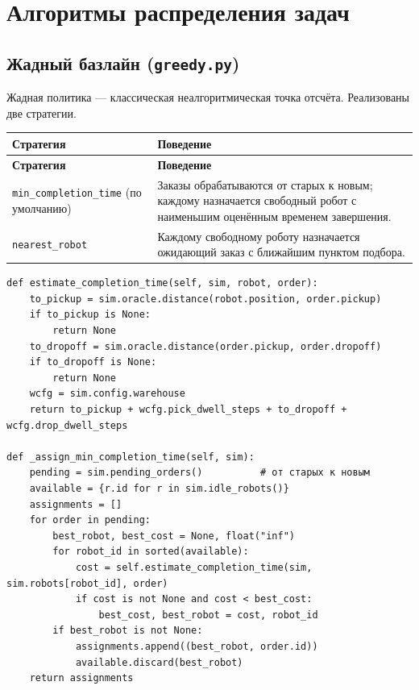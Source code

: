\documentclass[11pt,a4paper]{article}
\newcommand{\code}[1]{\texttt{#1}}
\begin{document}
\section{Алгоритмы распределения задач}
\subsection{Жадный базлайн (\code{greedy.py})}
Жадная политика — классическая неалгоритмическая точка отсчёта. Реализованы две
стратегии.

\begin{longtable}{@{}p{}p{}@{}}
\toprule
\textbf{Стратегия} & \textbf{Поведение} \\
\midrule
\endfirsthead
\toprule
\textbf{Стратегия} & \textbf{Поведение} \\
\midrule
\endhead
\code{min\_completion\_time} (по умолчанию) & Заказы обрабатываются от старых к
новым; каждому назначается свободный робот с наименьшим оценённым временем
завершения. \\
\code{nearest\_robot} & Каждому свободному роботу назначается ожидающий заказ с
ближайшим пунктом подбора. \\
\bottomrule
\end{longtable}

\begin{lstlisting}[style=py]
def estimate_completion_time(self, sim, robot, order):
    to_pickup = sim.oracle.distance(robot.position, order.pickup)
    if to_pickup is None:
        return None
    to_dropoff = sim.oracle.distance(order.pickup, order.dropoff)
    if to_dropoff is None:
        return None
    wcfg = sim.config.warehouse
    return to_pickup + wcfg.pick_dwell_steps + to_dropoff + wcfg.drop_dwell_steps

def _assign_min_completion_time(self, sim):
    pending = sim.pending_orders()          # от старых к новым
    available = {r.id for r in sim.idle_robots()}
    assignments = []
    for order in pending:
        best_robot, best_cost = None, float("inf")
        for robot_id in sorted(available):
            cost = self.estimate_completion_time(sim, sim.robots[robot_id], order)
            if cost is not None and cost < best_cost:
                best_cost, best_robot = cost, robot_id
        if best_robot is not None:
            assignments.append((best_robot, order.id))
            available.discard(best_robot)
    return assignments
\end{lstlisting}
\end{document}
